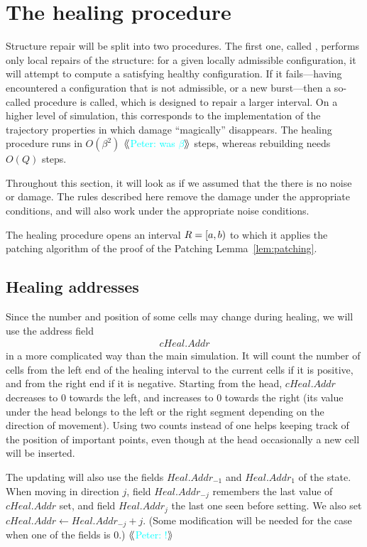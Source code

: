 \documentclass[12pt]{memoir}
\newcommand{\authnote}[3]
{{ \textcolor{#3}{$\langle\hspace{-0.2em}\langle$\textsf{\footnotesize #1: #2}$\rangle\hspace{-0.2em}\rangle$}}}
\newcommand{\authnote}[2]{}
\newcommand{\Pnote}[1]{{\authnote{Peter}{#1}{cyan}}}
\newcommand{\fld}[1]{\ensuremath{\textit{#1}}}
\newcommand{\R}{R}
\newcommand{\Addr}{\fld{Addr}}
\newcommand{\Heal}{\fld{Heal}}
\newcommand{\cHeal}{\fld{cHeal}}
\begin{document}
\section{The healing procedure}\label{sec:healing}

Structure repair will be split into two procedures.
The first one, called , performs
only local repairs of the structure: for a given locally admissible configuration,
it will attempt to compute a satisfying healthy configuration.
If it fails---having encountered a configuration that is not admissible, or
a new burst---then a so-called  procedure is called, which is designed
to repair a larger interval.
On a higher level of simulation, 
this corresponds to the implementation of the trajectory properties
in which damage ``magically'' disappears.
The healing procedure runs in \( O(\beta^{2}) \) \Pnote{was \( \beta \)}
steps, whereas rebuilding needs \( O(Q) \) steps.

Throughout this section, it will look as if we assumed that the there is no noise or damage.
The rules described here remove the damage under the 
appropriate conditions, and will also work under the appropriate noise conditions.

The healing procedure opens an interval \( \R = \lint{a}{b} \) to which it applies the
patching algorithm of the proof of the Patching Lemma~\ref{lem:patching}.

\subsection{Healing addresses}\label{sec:rec-addr}

Since the number and position of some cells may change during healing, 
we will use the address field
 \begin{align*}
 \cHeal.\Addr 
 \end{align*}
in a more complicated way than the main simulation.
It will count the number of cells 
from the left end of the healing interval to the current cells if it is positive,
and from the right end if it is negative.
Starting from the head, \( \cHeal.\Addr \) decreases to 0 towards the left, 
and increases to 0 towards the right (its value under the head belongs to
the left or the right segment depending on the direction of movement).
Using two counts instead of one helps keeping track of the position of important points,
even though at the head occasionally a new cell will be inserted.

The updating will also use the fields
\( \Heal.\Addr_{-1} \) and \( \Heal.\Addr_{1} \) of the state.
When moving in direction \( j \), field \( \Heal.\Addr_{-j} \) remembers the last
value of \( \cHeal.\Addr \) set, and field \( \Heal.\Addr_{j} \) the last one seen 
before setting.
We also set \( \cHeal.\Addr\gets\Heal.\Addr_{-j}+j \).
(Some modification will be needed for the case when one of the fields is 0.) \Pnote{!}
\end{document}
